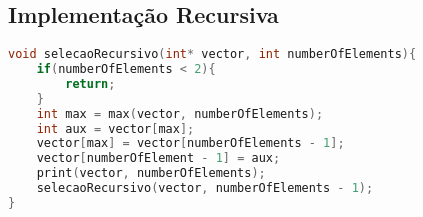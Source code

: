 \subsection{Implementação Recursiva}
\begin{lstlisting}[language=C]
void selecaoRecursivo(int* vector, int numberOfElements){
    if(numberOfElements < 2){
        return;
    }
    int max = max(vector, numberOfElements);
    int aux = vector[max];
    vector[max] = vector[numberOfElements - 1];
    vector[numberOfElement - 1] = aux;
    print(vector, numberOfElements);
    selecaoRecursivo(vector, numberOfElements - 1);
}
\end{lstlisting}
